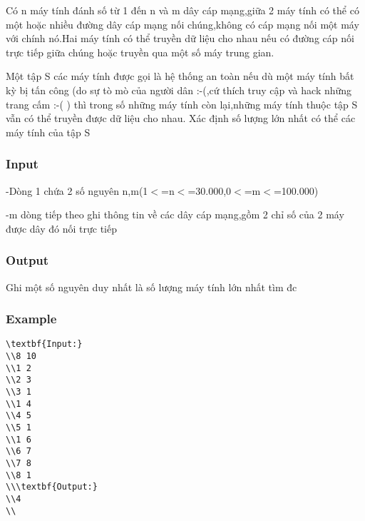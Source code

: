 



   Có n máy tính đánh số từ 1 đến n và m dây cáp mạng,giữa 2 máy tính có thể có một hoặc nhiều đường dây cáp mạng nối chúng,không có cáp mạng nối một máy với chính nó.Hai máy tính có thể truyền dữ liệu cho nhau nếu có đường cáp nối trực tiếp giữa chúng hoặc truyền qua một số máy trung gian.  

   Một tập S các máy tính được gọi là hệ thống an toàn nếu dù một máy tính bất kỳ bị tấn công (do sự tò mò của người dân :-(,cứ thích truy cập và hack những trang cấm :-( ) thì trong số những máy tính còn lại,những máy tính thuộc tập S vẫn có thể truyền được dữ liệu cho nhau. Xác định số lượng lớn nhất có thể các máy tính của tập S  

\subsubsection{   Input  }

   -Dòng 1 chứa 2 số nguyên n,m(1$<$=n$<$=30.000,0$<$=m$<$=100.000)  

   -m dòng tiếp theo ghi thông tin về các dây cáp mạng,gồm 2 chỉ số của 2 máy được dây đó nối trực tiếp  

\subsubsection{   Output  }

   Ghi một số nguyên duy nhất là số lượng máy tính lớn nhất tìm đc  

\subsubsection{   Example  }
\begin{verbatim}
\textbf{Input:}
\\8 10
\\1 2
\\2 3
\\3 1
\\1 4
\\4 5
\\5 1
\\1 6
\\6 7
\\7 8
\\8 1
\\\textbf{Output:}
\\4
\\\end{verbatim}
